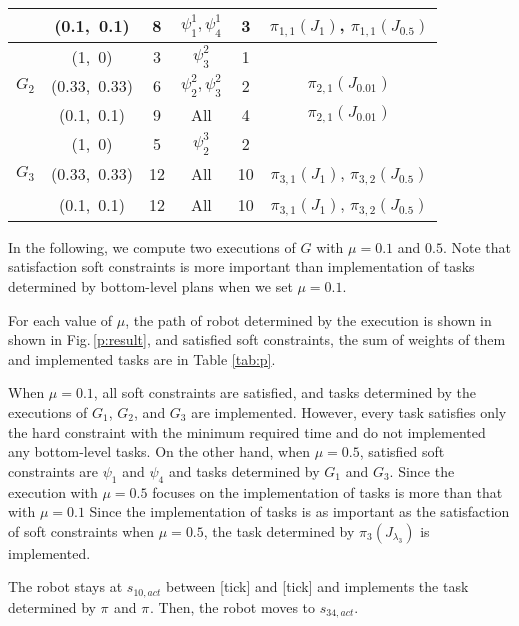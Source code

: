 \documentclass[journal,twoside,web]{IEEEtran}
\newcommand{\rfig}[1]{Fig.\,\ref{#1}}
\newcommand{\tick}{{\sf tick}}
\begin{document}
{\begin{table}[h]
\begin{subfigmatrix}{2}
{\begin{tabular}{c|c|c|c|c|c}
			& (0.1,~0.1)	& 8 & $\psi^{1}_1,\psi^{1}_4$&3  &$\pi_{1,1}(J_{1})$, $\pi_{1,1}(J_{0.5})$ \\
\hline			
			& (1,~0)		& 3 & $\psi^{2}_3$&1  \\
$G_2$ 	& (0.33,~0.33) 		& 6 & $\psi^{2}_2,\psi^{2}_3$&2  &$\pi_{2,1}(J_{0.01})$ \\
			& (0.1,~0.1)	& 9&All   &4  &$\pi_{2,1}(J_{0.01})$ \\
\hline	
			& (1,~0) 		& 5 & $\psi^{3}_2$ &2 \\
$G_3$ 	& (0.33,~0.33) 		& 12 &All&10  &$\pi_{3,1}(J_{1})$, $\pi_{3,2}(J_{0.5})$   \\
			& (0.1,~0.1) 	& 12&All  &10 &$\pi_{3,1}(J_{1})$, $\pi_{3,2}(J_{0.5})$ \\
\end{tabular}\label{tab:mw:bot}}
\end{subfigmatrix}
\end{table}
}
%
In the following, we compute two executions of $G$ with $\mu=0.1$ and $0.5$.
Note that satisfaction soft constraints is more important than implementation of tasks determined by bottom-level plans when we set $\mu=0.1$.

For each value of $\mu$, the path of robot determined by the execution is shown in shown in \rfig{p:result}, and satisfied soft constraints, the sum of weights of them and implemented tasks are in Table \ref{tab:p}.

When $\mu=0.1$, all soft constraints are satisfied, and tasks determined by the executions of $G_1$, $G_2$, and $G_3$ are implemented.
However, every task satisfies only the hard constraint with the minimum required time and do not implemented any bottom-level tasks. 
On the other hand, when $\mu=0.5$, satisfied soft constraints are $\psi_1$ and $\psi_4$ and tasks determined by $G_1$ and $G_3$.
Since the execution with $\mu=0.5$ focuses on the  implementation of tasks is  more than that with $\mu=0.1$
Since the implementation of tasks is as important as the satisfaction of soft constraints when $\mu = 0.5$, the task determined by $\pi_3(J_{\lambda_3})$ is implemented.

The robot stays at $s_{10,act}$ between [\tick] and [\tick] and implements the task determined by $\pi_{}$ and $\pi_{}$.
Then, the robot moves to $s_{34,act}$.
\end{document}
